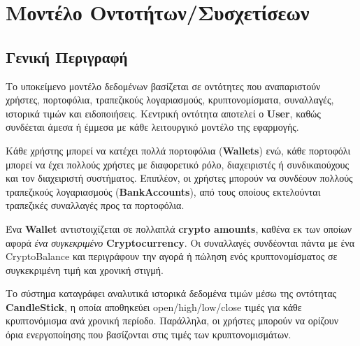 \section{Μοντέλο Οντοτήτων/Συσχετίσεων}

\subsection{Γενική Περιγραφή}
Το υποκείμενο μοντέλο δεδομένων βασίζεται σε οντότητες που αναπαριστούν χρήστες, πορτοφόλια,
τραπεζικούς λογαριασμούς, κρυπτονομίσματα, συναλλαγές, ιστορικά τιμών και ειδοποιήσεις. Κεντρική
οντότητα αποτελεί ο \textbf{User}, καθώς συνδέεται άμεσα 
ή έμμεσα με κάθε λειτουργικό μοντέλο της εφαρμογής.

Κάθε χρήστης μπορεί να κατέχει πολλά πορτοφόλια
(\textbf{Wallets}) ενώ, κάθε πορτοφόλι μπορεί να έχει πολλούς
χρήστες με διαφορετικό ρόλο, διαχειριστές ή συνδικαιούχους και τον διαχειριστή συστήματος. Επιπλέον, οι χρήστες μπορούν να
συνδέουν πολλούς τραπεζικούς λογαριασμούς (\textbf{BankAccounts}),
από τους οποίους εκτελούνται τραπεζικές συναλλαγές προς τα πορτοφόλια.

Ένα \textbf{Wallet} αντιστοιχίζεται σε πολλαπλά \textbf{crypto amounts}, καθένα εκ των οποίων αφορά \textit{ένα} \textit{συγκεκριμένο} \textbf{Cryptocurrency}. 
Οι συναλλαγές συνδέονται πάντα με ένα 
CryptoBalance και περιγράφουν την αγορά ή πώληση ενός κρυπτονομίσματος σε συγκεκριμένη τιμή και
χρονική στιγμή.

Το σύστημα καταγράφει αναλυτικά ιστορικά δεδομένα τιμών μέσω της οντότητας
\textbf{CandleStick}, η οποία αποθηκεύει open/high/low/close τιμές για κάθε κρυπτονόμισμα ανά
χρονική περίοδο. Παράλληλα, οι χρήστες μπορούν να ορίζουν όρια ενεργοποίησης
που βασίζονται στις τιμές των κρυπτονομισμάτων.

